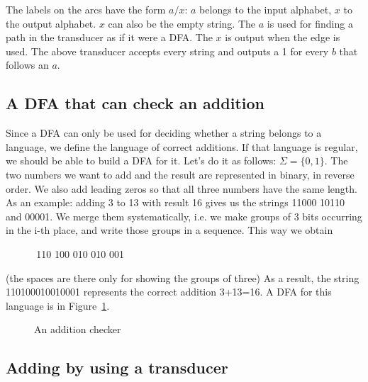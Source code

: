 The labels on the arcs have the form $a/x$: $a$ belongs to the input
alphabet, $x$ to the output alphabet. $x$ can also be the empty
string. The $a$ is used for finding a path in the transducer as if it
were a DFA. The $x$ is output when the edge is used.
The above transducer accepts every string and outputs a 1 for every
$b$ that follows an $a$.



\subsection{A DFA that can check an addition}

Since a DFA can only be used for deciding whether a string belongs to
a language, we define the language of correct additions. If that
language is regular, we should be able to build a DFA for it. Let's do
it as follows: $\Sigma = \{0,1\}$. The two numbers we want to add and
the result are represented in binary, in reverse order. We also add
leading zeros so that all three numbers have the same length. As an
example: adding 3 to 13 with result 16 gives us the strings
11000 10110 and 00001. We merge them systematically, i.e. we make
groups of 3 bits occurring in the i-th place, and write those groups
in a sequence. This way we obtain

$~~~~~~~~~~~~~~$110 100 010 010 001

(the spaces are there only for showing the groups of three)
As a result, the string 110100010010001 represents the correct
addition 3+13=16. A DFA for this language is in Figure~\ref{telop}.


\begin{figure}[h]
\caption{An addition checker \label{telop}}
\end{figure}


\subsection{Adding by using a transducer}

